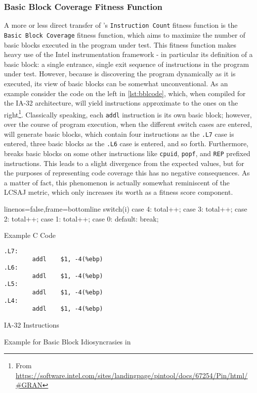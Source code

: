 \subsubsection{Basic Block Coverage Fitness Function}
A more or less direct transfer of \evosuite's \texttt{Instruction Count} fitness function is the 
\texttt{Basic Block Coverage} fitness function, which aims to maximize the number of basic blocks 
executed in the program under test. This fitness function makes heavy use of the {\small Intel} \pin
instrumentation framework - in particular its definition of a basic block: a single entrance, 
single exit sequence of instructions in the program under test. However, because \pin is discovering the 
program dynamically as it is executed, its view of basic blocks can be somewhat unconventional. As an 
example consider the code on the left in \cref{lst:bblcode}, which, when compiled for the IA-32 
architecture, will yield instructions approximate to the ones on the 
right\footnote{From \url{https://software.intel.com/sites/landingpage/pintool/docs/67254/Pin/html/\#GRAN}}.
Classically speaking, each \texttt{addl} instruction is its own basic block; however, over the course
of program execution, when the different switch cases are entered, \pin will generate basic blocks, which
contain four instructions as the \texttt{.L7} case is entered, three basic blocks as the \texttt{.L6}
case is entered, and so forth. Furthermore, \pin breaks basic blocks on some other instructions like 
\texttt{cpuid}, \texttt{popf}, and \texttt{REP} prefixed instructions. This leads to a slight divergence 
from the expected values, but for the purposes of representing code coverage this has no negative 
consequences. As a matter of fact, this phenomenon is actually somewhat reminiscent of the LCSAJ
metric\cite{Hennell:1976:PA}, which only increases its worth as a fitness score component.
\begin{listing}[h]
\centering
\begin{minipage}[b]{0.49\textwidth}
	\centering
	\begin{ccode*}{linenos=false,frame=bottomline}
	switch(i) {
        case 4: total++;
        case 3: total++;
        case 2: total++;
        case 1: total++;
        case 0:
        default: break;
    	}
\end{ccode*}
	Example C Code
 \end{minipage}
%
 \begin{minipage}[b]{0.49\textwidth}
  \centering
  \begin{verbatim}
.L7:
        addl    $1, -4(%ebp)
.L6:
        addl    $1, -4(%ebp)
.L5:
        addl    $1, -4(%ebp)
.L4:
        addl    $1, -4(%ebp)
\end{verbatim}
  IA-32 Instructions
 \end{minipage}
 \caption{Example for Basic Block Idiosyncrasies in \pin}
 \label{lst:bblcode}
\end{listing}

